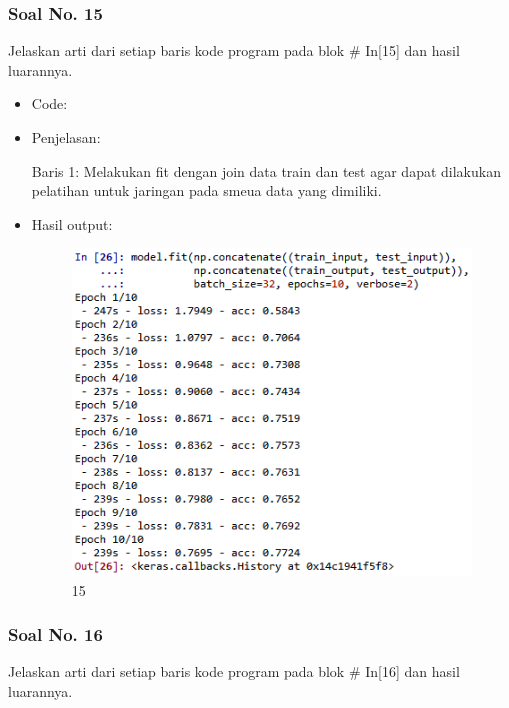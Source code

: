 \subsubsection{Soal No. 15}
Jelaskan arti dari setiap baris kode program pada blok \# In[15] dan hasil luarannya.

\begin{itemize}
\item Code:


\item Penjelasan:

Baris 1: Melakukan fit dengan join data train dan test agar dapat dilakukan pelatihan untuk jaringan pada smeua data yang dimiliki.

\item Hasil output:

\begin{figure}[!hbtp]
\centering
\includegraphics[scale=0.7]{figures/1174050/chapter7/25.png}
\caption{15}
\end{figure}

\end{itemize}

\subsubsection{Soal No. 16}
Jelaskan arti dari setiap baris kode program pada blok \# In[16] dan hasil luarannya.

